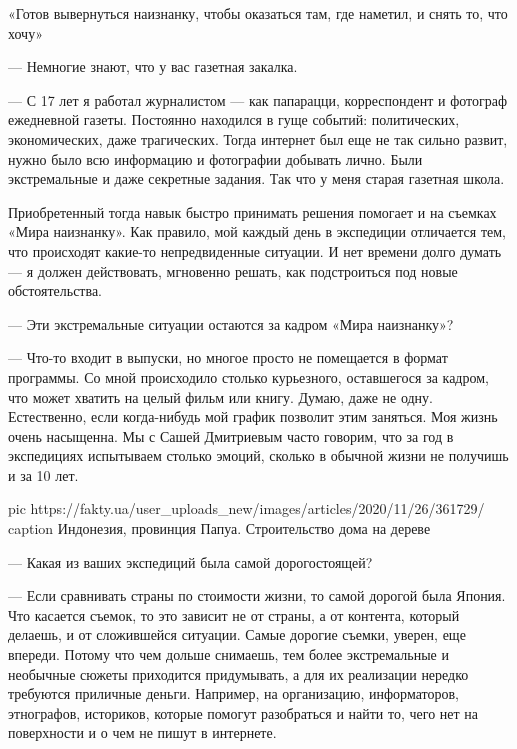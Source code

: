 «Готов вывернуться наизнанку, чтобы оказаться там, где наметил, и снять то, что
хочу»

--- Немногие знают, что у вас газетная закалка.

--- С 17 лет я работал журналистом --- как папарацци, корреспондент и фотограф
ежедневной газеты. Постоянно находился в гуще событий: политических,
экономических, даже трагических. Тогда интернет был еще не так сильно
развит, нужно было всю информацию и фотографии добывать лично. Были
экстремальные и даже секретные задания. Так что у меня старая газетная
школа.

Приобретенный тогда навык быстро принимать решения помогает и на съемках
«Мира наизнанку». Как правило, мой каждый день в экспедиции отличается
тем, что происходят какие-то непредвиденные ситуации. И нет времени долго
думать --- я должен действовать, мгновенно решать, как подстроиться под
новые обстоятельства.

--- Эти экстремальные ситуации остаются за кадром «Мира наизнанку»?

--- Что-то входит в выпуски, но многое просто не помещается в формат
программы. Со мной происходило столько курьезного, оставшегося за кадром,
что может хватить на целый фильм или книгу. Думаю, даже не одну.
Естественно, если когда-нибудь мой график позволит этим заняться. Моя
жизнь очень насыщенна. Мы с Сашей Дмитриевым часто говорим, что за год
в экспедициях испытываем столько эмоций, сколько в обычной жизни
не получишь и за 10 лет.

\ifcmt
pic https://fakty.ua/user_uploads_new/images/articles/2020/11/26/361729/%
caption Индонезия, провинция Папуа. Строительство дома на дереве
\fi


--- Какая из ваших экспедиций была самой дорогостоящей?

--- Если сравнивать страны по стоимости жизни, то самой дорогой была Япония.
Что касается съемок, то это зависит не от страны, а от контента, который
делаешь, и от сложившейся ситуации. Самые дорогие съемки, уверен, еще
впереди. Потому что чем дольше снимаешь, тем более экстремальные
и необычные сюжеты приходится придумывать, а для их реализации нередко
требуются приличные деньги. Например, на организацию, информаторов,
этнографов, историков, которые помогут разобраться и найти то, чего нет
на поверхности и о чем не пишут в интернете.

